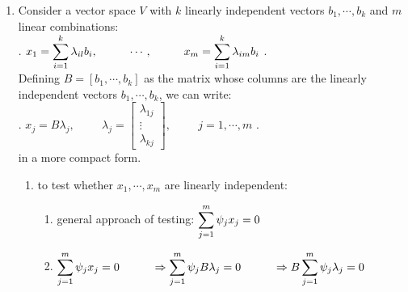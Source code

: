 \begin{enumerate}
    \item Consider a vector space $V$ with $k$ linearly independent vectors $b_1, \cdots , b_k$ and $m$ linear combinations:
    \hfill \cite{mfml/book/mml/Deisenroth-Faisal-Ong}
    \\
    .\hfill
    $
        x_1 = \displaystyle\sum_{i=1}^k \lambda_{il} b_i,
        \hspace{1cm}
        \cdots,
        \hspace{1cm}
        x_m = \displaystyle\sum_{i=1}^k \lambda_{im} b_i
    $
    \hfill.
    \hfill \cite{mfml/book/mml/Deisenroth-Faisal-Ong}
    \\
    \vspace{0.2cm}
    Defining $B = [b_1, \cdots , b_k]$ as the matrix whose columns are the linearly independent vectors $b_1, \cdots , b_k$, we can write:
    \hfill \cite{mfml/book/mml/Deisenroth-Faisal-Ong}
    \\
    .\hfill
    $
        x_j = B\lambda_j, 
        \hspace{1cm}
        \lambda_j = \begin{bmatrix}\lambda_{1j} \\ \vdots \\ \lambda_{kj}\end{bmatrix},
        \hspace{1cm}
        j=1,\cdots,m
    $
    \hfill.
    \hfill \cite{mfml/book/mml/Deisenroth-Faisal-Ong}
    \\
    in a more compact form.
    \hfill \cite{mfml/book/mml/Deisenroth-Faisal-Ong}

    \begin{enumerate}
        \item to test whether $x_1, \cdots , x_m$ are linearly independent:
        \hfill \cite{mfml/book/mml/Deisenroth-Faisal-Ong}
        \begin{enumerate}
            \item general approach of testing: $\displaystyle\sum^m_{j=1} \psi_jx_j = 0$
            \hfill \cite{mfml/book/mml/Deisenroth-Faisal-Ong}

            \item $
                    \displaystyle\sum^m_{j=1} \psi_j x_j = 0
                    \hspace{1cm}
                    \Rightarrow \displaystyle\sum^m_{j=1} \psi_j B \lambda_j = 0
                    \hspace{1cm}
                    \Rightarrow B \displaystyle\sum^m_{j=1} \psi_j \lambda_j = 0
            $
            \hfill \cite{mfml/book/mml/Deisenroth-Faisal-Ong}


\end{enumerate}
\end{enumerate}
\end{enumerate}

